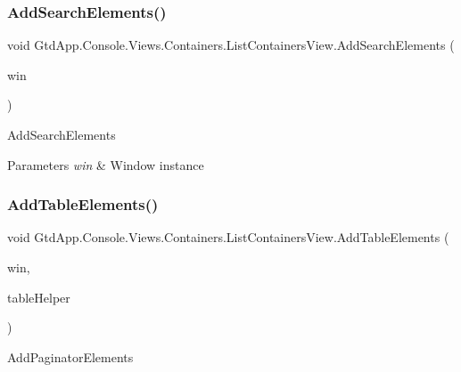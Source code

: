 \subsubsection{\texorpdfstring{Add\+Search\+Elements()}{AddSearchElements()}}
{\footnotesize\ttfamily void Gtd\+App.\+Console.\+Views.\+Containers.\+List\+Containers\+View.\+Add\+Search\+Elements (\begin{DoxyParamCaption}\item[{Window}]{win }\end{DoxyParamCaption})\hspace{0.3cm}{\ttfamily [protected]}}



Add\+Search\+Elements 


\begin{DoxyParams}{Parameters}
{\em win} & Window instance\\
\hline
\end{DoxyParams}
\mbox{\label{class_gtd_app_1_1_console_1_1_views_1_1_containers_1_1_list_containers_view_a2b7665ebd4d3b41c139ce5c7d3cd99e8}} 
\subsubsection{\texorpdfstring{Add\+Table\+Elements()}{AddTableElements()}}
{\footnotesize\ttfamily void Gtd\+App.\+Console.\+Views.\+Containers.\+List\+Containers\+View.\+Add\+Table\+Elements (\begin{DoxyParamCaption}\item[{Window}]{win,  }\item[{\mbox{\hyperlink{class_gtd_app_1_1_console_core_1_1_views_1_1_helpers_1_1_table_helper}{Table\+Helper}}}]{table\+Helper }\end{DoxyParamCaption})\hspace{0.3cm}{\ttfamily [protected]}}



Add\+Paginator\+Elements 


